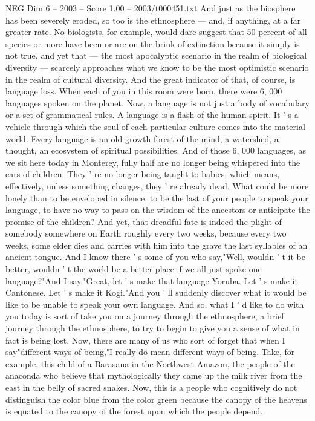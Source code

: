 \begin{textsample}{NEG Dim 6 – 2003 – Score 1.00 – 2003/t000451.txt}
And just as the biosphere has been severely eroded, so too is the ethnosphere — and, if anything, at a far greater rate.
No biologists, for example, would dare suggest that 50 percent of all species or more have been or are on the brink of extinction because it simply is not true, and yet that — the most apocalyptic scenario in the realm of biological diversity — scarcely approaches what we know to be the most optimistic scenario in the realm of cultural diversity.
And the great indicator of that, of course, is language loss.
When each of you in this room were born, there were 6, 000 languages spoken on the planet.
Now, a language is not just a body of vocabulary or a set of grammatical rules.
A language is a flash of the human spirit.
It ' s a vehicle through which the soul of each particular culture comes into the material world.
Every language is an old-growth forest of the mind, a watershed, a thought, an ecosystem of spiritual possibilities.
And of those 6, 000 languages, as we sit here today in Monterey, fully half are no longer being whispered into the ears of children.
They ' re no longer being taught to babies, which means, effectively, unless something changes, they ' re already dead.
What could be more lonely than to be enveloped in silence, to be the last of your people to speak your language, to have no way to pass on the wisdom of the ancestors or anticipate the promise of the children?
And yet, that dreadful fate is indeed the plight of somebody somewhere on Earth roughly every two weeks, because every two weeks, some elder dies and carries with him into the grave the last syllables of an ancient tongue.
And I know there ' s some of you who say,"Well, wouldn ' t it be better, wouldn ' t the world be a better place if we all just spoke one language?"And I say,"Great, let ' s make that language Yoruba.
Let ' s make it Cantonese.
Let ' s make it Kogi."And you ' ll suddenly discover what it would be like to be unable to speak your own language.
And so, what I ' d like to do with you today is sort of take you on a journey through the ethnosphere, a brief journey through the ethnosphere, to try to begin to give you a sense of what in fact is being lost.
Now, there are many of us who sort of forget that when I say"different ways of being,"I really do mean different ways of being.
Take, for example, this child of a Barasana in the Northwest Amazon, the people of the anaconda who believe that mythologically they came up the milk river from the east in the belly of sacred snakes.
Now, this is a people who cognitively do not distinguish the color blue from the color green because the canopy of the heavens is equated to the canopy of the forest upon which the people depend.

\end{textsample}
